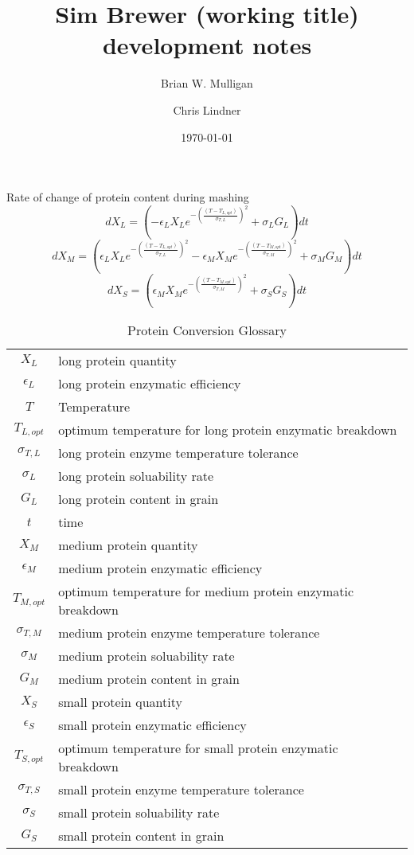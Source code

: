\documentclass{article}
\title{Sim Brewer (working title) development notes}
\author{Brian W. Mulligan \and Chris Lindner}
\date{\today}
\newcommand{\BE}{\begin{equation}}
\newcommand{\EE}{\end{equation}}
\begin{document}
\maketitle

Rate of change of protein content during mashing
\BE dX_L = \left(- \epsilon_L X_L e^{-\left(\frac{(T - T_{L,opt})}{\sigma_{T,L}}\right)^2} + \sigma_L G_L\right) dt \EE
\BE dX_M = \left(\epsilon_L X_L e^{-\left(\frac{(T - T_{L,opt})}{\sigma_{T,L}}\right)^2} - \epsilon_M X_M e^{-\left(\frac{(T - T_{M,opt})}{\sigma_{T,M}}\right)^2} + \sigma_M G_M\right)dt \EE
\BE dX_S = \left(\epsilon_M X_M e^{-\left(\frac{(T - T_{M,opt})}{\sigma_{T,M}}\right)^2} + \sigma_S G_S\right)dt \EE
\begin{table}[H]
\caption{Protein Conversion Glossary}
\begin{center}\begin{tabular}{|c|l|}
\hline
$X_L$ & long protein quantity\\
$\epsilon_L$ & long protein enzymatic efficiency\\
$T$ & Temperature\\
$T_{L,opt}$ & optimum temperature for long protein enzymatic breakdown\\
$\sigma_{T,L}$ & long protein enzyme temperature tolerance\\
$\sigma_L$ & long protein soluability rate\\
$G_L$ & long protein content in grain\\
$t$ & time\\
$X_M$ & medium protein quantity\\
$\epsilon_M$ & medium protein enzymatic efficiency\\
$T_{M,opt}$ & optimum temperature for medium protein enzymatic breakdown\\
$\sigma_{T,M}$ & medium protein enzyme temperature tolerance\\
$\sigma_M$ & medium protein soluability rate\\
$G_M$ & medium protein content in grain\\
$X_S$ & small protein quantity\\
$\epsilon_S$ & small protein enzymatic efficiency\\
$T_{S,opt}$ & optimum temperature for small protein enzymatic breakdown\\
$\sigma_{T,S}$ & small protein enzyme temperature tolerance\\
$\sigma_S$ & small protein soluability rate\\
$G_S$ & small protein content in grain\\
\hline
\end{tabular}\end{center}\end{table}
\end{document}

